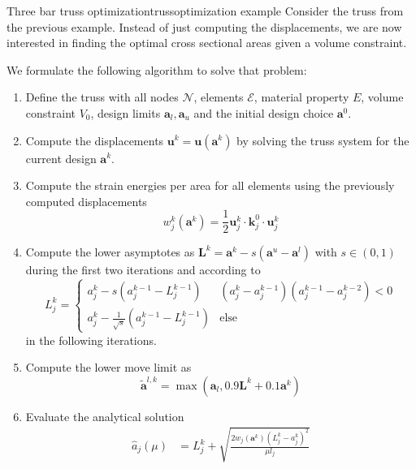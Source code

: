 \begin{example}{Three bar truss optimization}{trussoptimization example}
    Consider the truss from the previous example. Instead of just computing the displacements, we are now interested in finding the optimal cross sectional areas given a volume constraint.

    We formulate the following algorithm to solve that problem: 
    \begin{enumerate}
        \item Define the truss with all nodes $\mathcal{N}$, elements $\mathcal{E}$, material property $E$, volume constraint $V_0$, design limits $\mathbf{a}_l, \mathbf{a}_u$ and the initial design choice $\mathbf{a}^0$.
        \item Compute the displacements $\mathbf{u}^k = \mathbf{u}(\mathbf{a}^k)$ by solving the truss system for the current design $\mathbf{a}^k$.
        \item Compute the strain energies per area for all elements using the previously computed displacements   
        \begin{equation}
            w^k_j(\mathbf{a}^k) = \frac{1}{2}\mathbf{u}^k_j  \cdot \mathbf{k}^0_j \cdot \mathbf{u}^k_j
        \end{equation}
        \item Compute the lower asymptotes as $\mathbf{L}^k =\mathbf{a}^k - s (\mathbf{a}^u - \mathbf{a}^l)$ with $s \in (0,1)$ during the first two iterations and according to 
        \begin{equation}
            L^k_j = 
            \begin{cases}
                a^k_j - s  (a^{k-1}_j-L^{k-1}_j) & (a_j^k-a_j^{k-1})(a_j^{k-1}-a_j^{k-2}) < 0\\
                a^k_j - \frac{1}{\sqrt{s}}  (a^{k-1}_j-L^{k-1}_j) & \text{else}
            \end{cases}
        \end{equation}
        in the following iterations.
        \item Compute the lower move limit as 
        \begin{equation}
            \tilde{\mathbf{a}}^{l,k} = \max(\mathbf{a}_l,  0.9 \mathbf{L}^k + 0.1 \mathbf{a}^k)
        \end{equation}
        \item Evaluate the analytical solution
            \begin{align}
                \hat{a}_j(\mu) &= L_j^k + \sqrt{\frac{2 w_j (\mathbf{a}^k)
                (L^k_j-a^k_j)^2}{\mu l_j}} \\

\end{align}
\end{enumerate}
\end{example}

